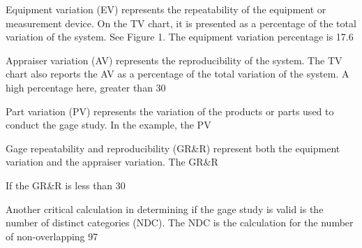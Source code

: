 Equipment variation (EV) represents the repeatability of the equipment or measurement device. On the TV chart, it is presented as a percentage of the total variation of the system. See Figure 1. The equipment variation percentage is 17.6%

Appraiser variation (AV) represents the reproducibility of the system. The TV chart also reports the AV as a percentage of the total variation of the system. A high percentage here, greater than 30%

Part variation (PV) represents the variation of the products or parts used to conduct the gage study. In the example, the PV%

Gage repeatability and reproducibility (GR&R) represent both the equipment variation and the appraiser variation. The GR&R%

If the GR&R is less than 30%

Another critical calculation in determining if the gage study is valid is the number of distinct categories (NDC). The NDC is the calculation for the number of non-overlapping 97%

